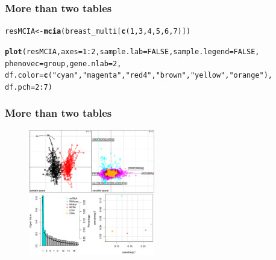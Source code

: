 \documentclass[10pt,xcolor=dvipsnames]{beamer}\usepackage[]{graphicx}\usepackage[]{color}
\makeatletter
\newcommand{\hlnum}[1]{\textcolor[rgb]{0.686,0.059,0.569}{#1}}%
\newcommand{\hlstr}[1]{\textcolor[rgb]{0.192,0.494,0.8}{#1}}%
\newcommand{\hlopt}[1]{\textcolor[rgb]{0,0,0}{#1}}%
\newcommand{\hlstd}[1]{\textcolor[rgb]{0.345,0.345,0.345}{#1}}%
\newcommand{\hlkwb}[1]{\textcolor[rgb]{0.69,0.353,0.396}{#1}}%
\newcommand{\hlkwc}[1]{\textcolor[rgb]{0.333,0.667,0.333}{#1}}%
\newcommand{\hlkwd}[1]{\textcolor[rgb]{0.737,0.353,0.396}{\textbf{#1}}}%
\newenvironment{kframe}{%
 \def\at@end@of@kframe{}%
 \ifinner\ifhmode%
  \def\at@end@of@kframe{\end{minipage}}%
  \begin{minipage}{\columnwidth}%
 \fi\fi%
 \def\FrameCommand##1{\hskip\@totalleftmargin \hskip-\fboxsep
 \colorbox{shadecolor}{##1}\hskip-\fboxsep
     \hskip-\linewidth \hskip-\@totalleftmargin \hskip\columnwidth}%
 \MakeFramed {\advance\hsize-\width
   \@totalleftmargin\z@ \linewidth\hsize
   \@setminipage}}%
 {\par\unskip\endMakeFramed%
 \at@end@of@kframe}
\newenvironment{knitrout}{}{} %
\makeatother
\begin{document}
\begin{frame}[fragile]\frametitle{More than two tables}


\begin{knitrout}\footnotesize
{}\color{fgcolor}\begin{kframe}
\begin{alltt}
\hlstd{resMCIA} \hlkwb{<-} \hlkwd{mcia}\hlstd{( breast_multi[} \hlkwd{c}\hlstd{(}\hlnum{1}\hlstd{,}\hlnum{3}\hlstd{,}\hlnum{4}\hlstd{,}\hlnum{5}\hlstd{,}\hlnum{6}\hlstd{,}\hlnum{7}\hlstd{) ] )}
\end{alltt}
\end{kframe}
\end{knitrout}


\begin{knitrout}\footnotesize
{}\color{fgcolor}\begin{kframe}
\begin{alltt}
\hlkwd{plot}\hlstd{(resMCIA,} \hlkwc{axes}\hlstd{=}\hlnum{1}\hlopt{:}\hlnum{2}\hlstd{,} \hlkwc{sample.lab}\hlstd{=}\hlnum{FALSE}\hlstd{,} \hlkwc{sample.legend}\hlstd{=}\hlnum{FALSE}\hlstd{,}
     \hlkwc{phenovec}\hlstd{=group,} \hlkwc{gene.nlab}\hlstd{=}\hlnum{2}\hlstd{,}
     \hlkwc{df.color}\hlstd{=}\hlkwd{c}\hlstd{(}\hlstr{"cyan"}\hlstd{,} \hlstr{"magenta"}\hlstd{,} \hlstr{"red4"}\hlstd{,} \hlstr{"brown"}\hlstd{,}\hlstr{"yellow"}\hlstd{,} \hlstr{"orange"}\hlstd{),}
     \hlkwc{df.pch}\hlstd{=}\hlnum{2}\hlopt{:}\hlnum{7}\hlstd{)}
\end{alltt}
\end{kframe}
\end{knitrout}
\end{frame}


\begin{frame}[fragile]\frametitle{More than two tables}

\begin{figure}
\begin{center}
 \includegraphics[width=5.5cm]{figure/plot_mcia-1}
\end{center}
\end{figure}

\end{frame}
\end{document}
